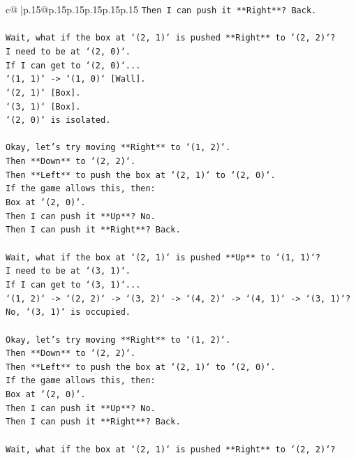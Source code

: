 \documentclass{article}
\begin{document}
{\begin{supertabular}{c@{$\;$}|p{.15\linewidth}@{}p{.15\linewidth}p{.15\linewidth}p{.15\linewidth}p{.15\linewidth}p{.15\linewidth}}
{{{\texttt{Then I can push it **Right**? Back.} \\
\\ 
\texttt{Wait, what if the box at `(2, 1)` is pushed **Right** to `(2, 2)`?} \\
\texttt{I need to be at `(2, 0)`.} \\
\texttt{If I can get to `(2, 0)`...} \\
\texttt{`(1, 1)` {-}> `(1, 0)` {[}Wall{]}.} \\
\texttt{`(2, 1)` {[}Box{]}.} \\
\texttt{`(3, 1)` {[}Box{]}.} \\
\texttt{`(2, 0)` is isolated.} \\
\\ 
\texttt{Okay, let's try moving **Right** to `(1, 2)`.} \\
\texttt{Then **Down** to `(2, 2)`.} \\
\texttt{Then **Left** to push the box at `(2, 1)` to `(2, 0)`.} \\
\texttt{If the game allows this, then:} \\
\texttt{Box at `(2, 0)`.} \\
\texttt{Then I can push it **Up**? No.} \\
\texttt{Then I can push it **Right**? Back.} \\
\\ 
\texttt{Wait, what if the box at `(2, 1)` is pushed **Up** to `(1, 1)`?} \\
\texttt{I need to be at `(3, 1)`.} \\
\texttt{If I can get to `(3, 1)`...} \\
\texttt{`(1, 2)` {-}> `(2, 2)` {-}> `(3, 2)` {-}> `(4, 2)` {-}> `(4, 1)` {-}> `(3, 1)`? No, `(3, 1)` is occupied.} \\
\\ 
\texttt{Okay, let's try moving **Right** to `(1, 2)`.} \\
\texttt{Then **Down** to `(2, 2)`.} \\
\texttt{Then **Left** to push the box at `(2, 1)` to `(2, 0)`.} \\
\texttt{If the game allows this, then:} \\
\texttt{Box at `(2, 0)`.} \\
\texttt{Then I can push it **Up**? No.} \\
\texttt{Then I can push it **Right**? Back.} \\
\\ 
\texttt{Wait, what if the box at `(2, 1)` is pushed **Right** to `(2, 2)`?} \\
}}}
\end{supertabular}}
\end{document}
